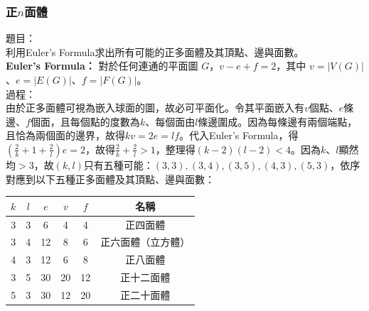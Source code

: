 \documentclass[a4paper,12pt]{report}
\begin{document}
\subsubsection{正$n$面體}
題目：\\
利用Euler's Formula求出所有可能的正多面體及其頂點、邊與面數。\\
\textbf{Euler's Formula：} 對於任何連通的平面圖 \(G\)，\(v - e + f = 2\)，其中 \(v=|V(G)|\)、\(e=|E(G)|\)、\(f=|F(G)|\)。\\
過程：\\
由於正多面體可視為嵌入球面的圖，故必可平面化。令其平面嵌入有$v$個點、$e$條邊、$f$個面，且每個點的度數為$k$、每個面由$l$條邊圍成。因為每條邊有兩個端點，且恰為兩個面的邊界，故得$kv=2e=lf$。代入Euler's Formula，得$\left(\frac{2}{k}+1+\frac{2}{l}\right)e=2$，故得$\frac{2}{k}+\frac{2}{l}>1$，整理得$(k-2)(l-2)<4$。因為$k$、$l$顯然均$>3$，故$(k, l)$只有五種可能：$(3,3),(3,4),(3,5),(4,3),(5,3)$，依序對應到以下五種正多面體及其頂點、邊與面數： \\
\begin{longtable}[c]{|c|c|c|c|c|c|}
\hline
$k$ & $l$ & $e$ & $v$ & $f$ & 名稱 \\
\hline
3 & 3 & 6 & 4 & 4 & 正四面體 \\
\hline
3 & 4 & 12 & 8 & 6 & 正六面體（立方體） \\
\hline
4 & 3 & 12 & 6 & 8 & 正八面體 \\
\hline
3 & 5 & 30 & 20 & 12 & 正十二面體 \\
\hline
5 & 3 & 30 & 12 & 20 & 正二十面體 \\
\hline
\end{longtable}
\end{document}
